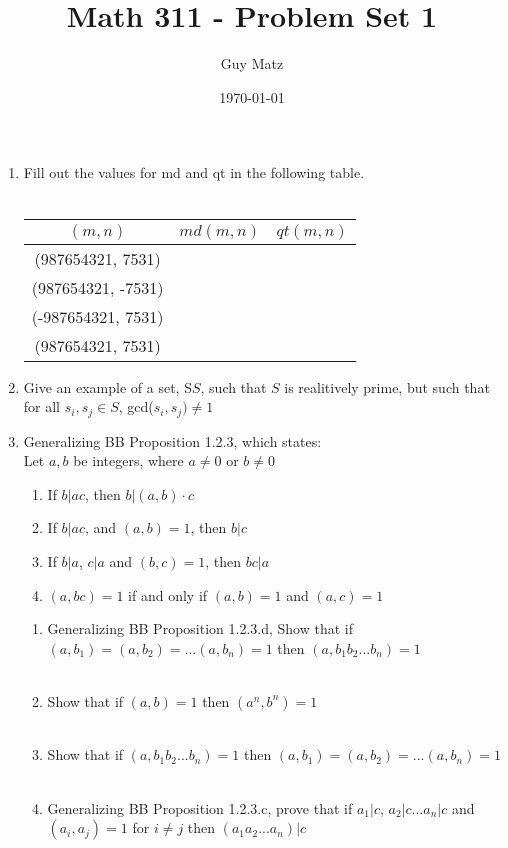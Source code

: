 \documentclass[11pt]{article}
\title{\textbf{Math 311 - Problem Set 1}}
\author{Guy Matz}
\date{\today}
\begin{document}


\begin{enumerate}  %
\item Fill out the values for md and qt in the following table.\\
\\
\begin{center}
  \begin{tabular}{ c | c | c }
    $(m,n)$ & $md(m,n)$ & $qt(m,n)$ \\ \hline
    (987654321, 7531) &  &  \\ \hline
    (987654321, -7531) &  &  \\ \hline
    (-987654321, 7531) &  &  \\ \hline
    (987654321, 7531) & & \\ \hline
  \end{tabular}
\end{center}

\newpage %
\item Give an example of a set, S$S$, such that $S$ is realitively prime, but such that for all $s_i, s_j \in S$, gcd($s_i, s_j) \neq 1$


\newpage %
\item Generalizing BB Proposition 1.2.3, which states: \\
Let $a, b$ be integers, where $a \neq 0$ or $b \neq 0$
\begin{enumerate}
\item If $b | ac$, then $b | (a,b) \cdot c$
\item If $b | ac$, and $(a, b) = 1$, then $b|c$
\item If $b | a$, $c | a$ and $(b, c) = 1$, then $bc|a$
\item $(a, bc) =1 $ if and only if $(a,b) = 1$ and $(a,c) = 1$
\end{enumerate}

\begin{enumerate}
\item Generalizing BB Proposition 1.2.3.d, Show that if $(a,b_1)=(a,b_2)=... (a,b_n)=1$ then $(a,b_1 b_2 ... b_n) = 1$\\
\\
\item Show that if $(a, b) = 1$ then $(a^n, b^n) = 1$\\
\\
\item Show that if $(a, b_1 b_2...b_n) = 1$ then $(a, b_1) = (a, b_2) = ... (a,b_n) = 1$\\
\\
\item Generalizing BB Proposition 1.2.3.c, prove that if $a_1 | c$, $a_2| c$...$a_n|c$ and $(a_i, a_j) = 1$ for $i \neq j$ then $(a_1 a_2...a_n)|c$


\end{enumerate}
\end{enumerate}
\end{document}
